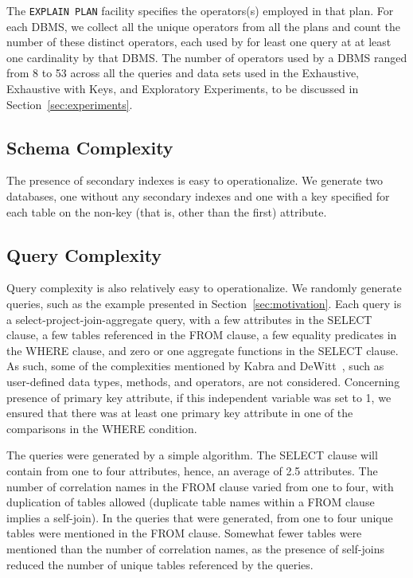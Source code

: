 \documentclass[prodmode,acmtods]{acmsmall}
\begin{document}
The {\tt EXPLAIN PLAN} facility specifies the operators(s) \hbox{employed} in that
plan. For each \hbox{DBMS}, we collect all the unique operators from all the plans
and count the number of these distinct operators, each used by for least one
query at at least one cardinality by that \hbox{DBMS}. The number of operators used
by a \hbox{DBMS} ranged from 8 to 53 across all the queries and data sets
used in the Exhaustive, Exhaustive with Keys, and Exploratory Experiments,
to be discussed in Section~\ref{sec:experiments}.

\subsection{Schema Complexity}
The presence of secondary indexes is easy to operationalize. We generate two
databases, one without any secondary indexes and one with a key specified
for each table on the non-key (that is, other than the first) attribute.

\subsection{Query Complexity}\label{sec:querycomplexity}
Query complexity is also relatively easy to operationalize. We randomly generate queries,
such as the example presented in Section~\ref{sec:motivation}. Each query
is a select-project-join-aggregate query, with a few attributes in the
SELECT clause, a few tables referenced in the FROM clause, a few
equality predicates in the WHERE clause, and zero or one aggregate
functions in the SELECT clause. As such, some of the complexities
mentioned by Kabra and \hbox{DeWitt~\cite{kabra98},} such as
user-defined data types, methods, and operators, are not
considered. Concerning presence of primary key attribute, if this independent
variable was set to 1, we ensured that there was at least one primary key
attribute in one of the comparisons in the WHERE condition.

The queries were generated
by a simple algorithm. 
The SELECT clause will contain from one to four
attributes, hence, an average of 2.5 attributes. The number of
correlation names
in the FROM clause varied from one to four, with duplication of tables
allowed (duplicate table names within a FROM clause implies a self-join).
In the queries that were generated, from one to four unique tables were
mentioned in the FROM clause. Somewhat fewer tables were mentioned than the
number of correlation names, as the presence of self-joins reduced the
number of unique tables referenced by the queries.
\end{document}
